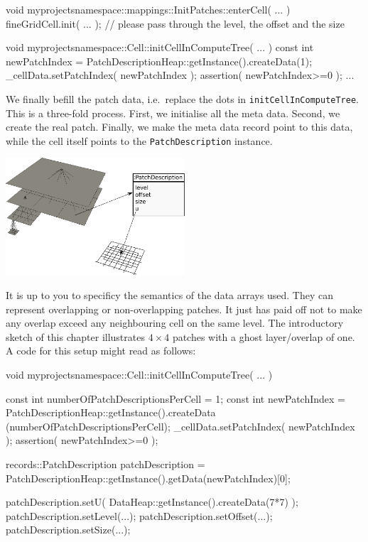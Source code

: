 \begin{code}
void myprojectsnamespace::mappings::InitPatches::enterCell(
  ...
) {
  fineGridCell.init( ... ); // please pass through the level, the offset and the size
}


void myprojectsnamespace::Cell::initCellInComputeTree( ... ) {
  const int newPatchIndex = PatchDescriptionHeap::getInstance().createData(1);
  _cellData.setPatchIndex( newPatchIndex );
  assertion( newPatchIndex>=0 );
  ...
}

\end{code}

\noindent
We finally befill the patch data, i.e.~replace the dots in
\texttt{initCellInComputeTree}.
This is a three-fold process.
First, we initialise all the meta data.
Second, we create the real patch. 
Finally, we make the meta data record point to this data, while 
the cell itself points to the \texttt{PatchDescription} instance.
 
\begin{center}
  \includegraphics[width=0.5\textwidth]{22_patch-based-solver/data.pdf}
\end{center}

\noindent
It is up to you to specificy the semantics of the data arrays used. 
They can represent overlapping or non-overlapping patches.
It just has paid off not to make any overlap exceed any neighbouring cell on the
same level.
The introductory sketch of this chapter illustrates $4\times 4$ patches with a
ghost layer/overlap of one. 
A code for this setup might read as follows:

\begin{code}
void myprojectsnamespace::Cell::initCellInComputeTree( ... ) {
  const int numberOfPatchDescriptionsPerCell = 1;
  const int newPatchIndex = PatchDescriptionHeap::getInstance().createData
    (numberOfPatchDescriptionsPerCell);
  _cellData.setPatchIndex( newPatchIndex );
  assertion( newPatchIndex>=0 );

  records::PatchDescription patchDescription =
    PatchDescriptionHeap::getInstance().getData(newPatchIndex)[0]; 
  
  patchDescription.setU( DataHeap::getInstance().createData(7*7) );
  patchDescription.setLevel(...);
  patchDescription.setOffset(...);
  patchDescription.setSize(...);
}

\end{code}


